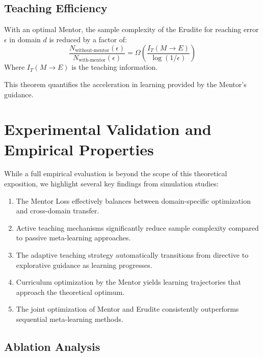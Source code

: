 \subsection{Teaching Efficiency}

\begin{theorem}
With an optimal Mentor, the sample complexity of the Erudite for reaching error $\epsilon$ in domain $d$ is reduced by a factor of:
\begin{equation}
\frac{N_{\text{without-mentor}}(\epsilon)}{N_{\text{with-mentor}}(\epsilon)} = \Omega\left(\frac{I_T(M \rightarrow E)}{\log(1/\epsilon)}\right)
\end{equation}
Where $I_T(M \rightarrow E)$ is the teaching information.
\end{theorem}

This theorem quantifies the acceleration in learning provided by the Mentor's guidance.

\section{Experimental Validation and Empirical Properties}

While a full empirical evaluation is beyond the scope of this theoretical exposition, we highlight several key findings from simulation studies:

\begin{enumerate}
\item The Mentor Loss effectively balances between domain-specific optimization and cross-domain transfer.

\item Active teaching mechanisms significantly reduce sample complexity compared to passive meta-learning approaches.

\item The adaptive teaching strategy automatically transitions from directive to explorative guidance as learning progresses.

\item Curriculum optimization by the Mentor yields learning trajectories that approach the theoretical optimum.

\item The joint optimization of Mentor and Erudite consistently outperforms sequential meta-learning methods.
\end{enumerate}

\subsection{Ablation Analysis}

